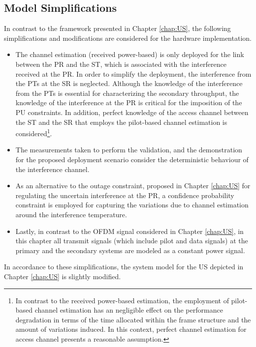 \subsection{Model Simplifications}
\label{ssec:simp1}
In contrast to the framework presented in Chapter \ref{chap:US}, the following simplifications and modifications are considered for the hardware implementation.
\begin{itemize}
\item The channel estimation (received power-based) is only deployed for the link between the PR and the ST, which is associated with the interference received at the PR. In order to simplify the deployment, the interference from the PTs at the SR is neglected. Although the knowledge of the interference from the PTs is essential for characterizing the secondary throughput, the knowledge of the interference at the PR is critical for the imposition of the PU constraints. In addition, perfect knowledge of the access channel between the ST and the SR that employs the pilot-based channel estimation is considered\footnote{In contrast to the received power-based estimation, the employment of pilot-based channel estimation has an negligible effect on the performance degradation in terms of the time allocated within the frame structure and the amount of variations induced. In this context, perfect channel estimation for access channel presents a reasonable assumption.}.  
\item The measurements taken to perform the validation, and the demonstration for the proposed deployment scenario consider the deterministic behaviour of the interference channel.  
\item As an alternative to the outage constraint, proposed in Chapter \ref{chap:US} for regulating the uncertain interference at the PR, a confidence probability constraint is employed for capturing the variations due to channel estimation around the interference temperature. %
\item Lastly, in contrast to the OFDM signal considered in Chapter \ref{chap:US}, in this chapter all transmit signals (which include pilot and data signals) at the primary and the secondary systems are modeled as a constant power signal. 
\end{itemize}

In accordance to these simplifications, the system model for the US depicted in Chapter \ref{chap:US} is slightly modified. 

